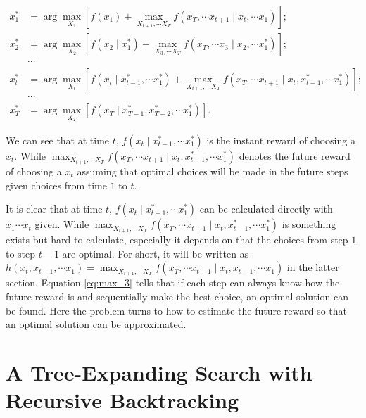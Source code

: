 \documentclass[12pt]{article}
\begin{document}
\begin{equation}
\label{eq:max_3}
\begin{aligned}
x_{1}^{*} & = \arg \max_{X_{1}} \left[ f(x_{1}) + \max_{X_{t+1}, \cdots X_{T}} f(x_{T}, \cdots x_{t+1} \mid x_{t}, \cdots x_{1})  \right]; \\
x_{2}^{*} & = \arg \max_{X_{2}} \left[ f(x_{2} \mid x_{1}^{*}) + \max_{X_{3}, \cdots X_{T}} f(x_{T}, \cdots x_{3} \mid x_{2}, \cdots x_{1}^{*})  \right]; \\
& \cdots \\
x_{t}^{*} & = \arg \max_{X_{t}} \left[ f(x_{t} \mid x_{t-1}^{*}, \cdots x_{1}^{*}) + \max_{X_{t+1}, \cdots X_{T}} f(x_{T}, \cdots x_{t+1} \mid x_{t},  x_{t-1}^{*}, \cdots x_{1}^{*}) \right]; \\
& \cdots \\
x_{T}^{*} & = \arg \max_{X_{T}} \left[ f(x_{T} \mid x_{T-1}^{*}, x_{T-2}^{*}, \cdots x_{1}^{*})\right].
\end{aligned}
\end{equation}

We can see that at time $ t $, 
$ f(x_{t} \mid x_{t-1}^{*}, \cdots x_{1}^{*}) $ is the instant reward of choosing a $ x_{t} $. While $ \max_{X_{t+1}, \cdots X_{T}} f(x_{T}, \cdots x_{t+1} \mid x_{t},  x_{t-1}^{*}, \cdots x_{1}^{*}) $ denotes the future reward of choosing a $ x_{t} $ assuming that optimal choices will be made in the future steps given choices from time $ 1 $ to $ t $.

It is clear that at time $ t $, $ f(x_{t} \mid x_{t-1}^{*}, \cdots x_{1}^{*}) $ can be calculated directly with $ x_{1} \cdots x_{t} $ given. While $ \max_{X_{t+1}, \cdots X_{T}} f(x_{T}, \cdots x_{t+1} \mid x_{t},  x_{t-1}^{*}, \cdots x_{1}^{*}) $ is something exists but hard to calculate, especially it depends on that the choices from step $ 1 $ to step $ t-1 $ are optimal. For short, it will be written as $ h(x_{t},  x_{t-1}, \cdots x_{1}) = \max_{X_{t+1}, \cdots X_{T}} f(x_{T}, \cdots x_{t+1} \mid x_{t},  x_{t-1}, \cdots x_{1}) $ in the latter section. Equation \ref{eq:max_3} tells that if each step can always know how the future reward is and sequentially make the best choice, an optimal solution can be found. Here the problem turns to how to estimate the future reward so that an optimal solution can be approximated.

\section{A Tree-Expanding Search with Recursive Backtracking}
\end{document}
